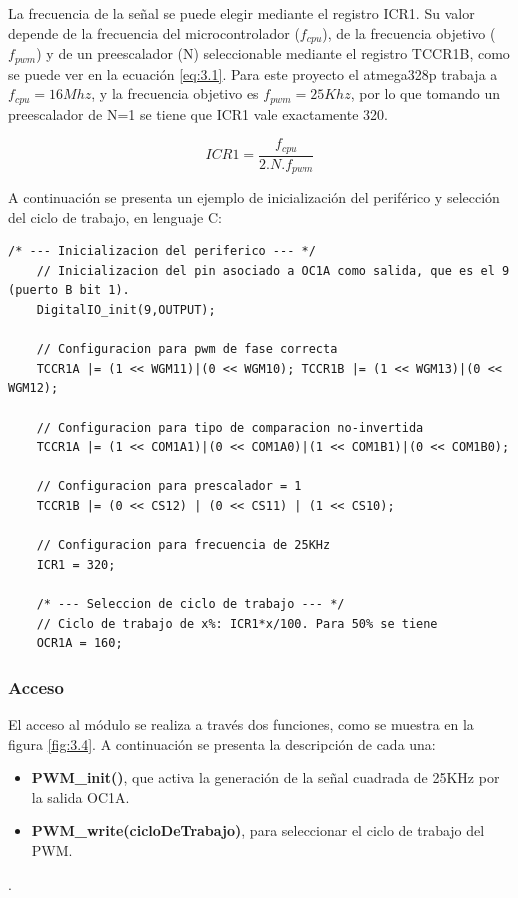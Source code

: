 La frecuencia de la señal se puede elegir mediante el registro ICR1. Su valor depende de la frecuencia del microcontrolador (\(f_{cpu}\)), de la frecuencia objetivo (\(f_{pwm}\)) y de un preescalador (N) seleccionable mediante el registro TCCR1B, como se puede ver en la ecuación \ref{eq:3.1}. Para este proyecto el atmega328p trabaja a \(f_{cpu} = 16Mhz\), y la frecuencia objetivo es \(f_{pwm} = 25Khz\), por lo que tomando un preescalador de N=1 se tiene que ICR1 vale exactamente 320.

\begin{equation} \label{eq:\theequation}
	ICR1 = \frac{f_{cpu}}{2.N.f_{pwm}}
\end{equation}

A continuación se presenta un ejemplo de inicialización del periférico y selección del ciclo de trabajo, en lenguaje C: 
\begin{lstlisting}[style=CStyle]
	/* --- Inicializacion del periferico --- */
	// Inicializacion del pin asociado a OC1A como salida, que es el 9 (puerto B bit 1).
	DigitalIO_init(9,OUTPUT);
	
	// Configuracion para pwm de fase correcta
	TCCR1A |= (1 << WGM11)|(0 << WGM10); TCCR1B |= (1 << WGM13)|(0 << WGM12);
	
	// Configuracion para tipo de comparacion no-invertida
	TCCR1A |= (1 << COM1A1)|(0 << COM1A0)|(1 << COM1B1)|(0 << COM1B0);
	
	// Configuracion para prescalador = 1
	TCCR1B |= (0 << CS12) | (0 << CS11) | (1 << CS10);
	
	// Configuracion para frecuencia de 25KHz
	ICR1 = 320;
	
	/* --- Seleccion de ciclo de trabajo --- */
	// Ciclo de trabajo de x%: ICR1*x/100. Para 50% se tiene
	OCR1A = 160;
\end{lstlisting}

\subsubsection{Acceso}
El acceso al módulo se realiza a través dos funciones, como se muestra en la figura \ref{fig:3.4}. A continuación se presenta la descripción de cada una:
\begin{itemize}
	\item \textbf{PWM\_init()}, que activa la generación de la señal cuadrada de 25KHz por la salida OC1A.
	\item \textbf{PWM\_write(cicloDeTrabajo)}, para seleccionar el ciclo de trabajo del PWM.
\end{itemize}. 

